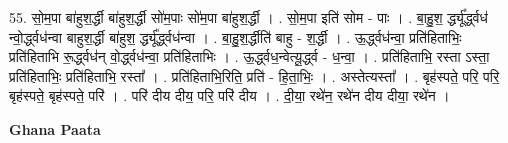 \documentclass[17pt]{extarticle}
\begin{document}
55. सो॒म॒पा बा॑हुश॒र्द्धी बा॑हुश॒र्द्धी सो॑म॒पाः सो॑म॒पा बा॑हुश॒र्द्धी । . सो॒म॒पा इति॑ सोम - पाः । . बा॒हु॒श॒ र्द्ध्यू᳚र्द्ध्वध॑ न्वो॒र्द्ध्वध॑न्वा बाहुश॒र्द्धी बा॑हुश॒ र्द्ध्यू᳚र्द्ध्वध॑न्वा । . बा॒हु॒श॒र्द्धीति॑ बाहु - श॒र्द्धी । . ऊ॒र्द्ध्वध॑न्वा॒ प्रति॑हिताभिः॒ प्रति॑हिताभि रू॒र्द्ध्वध॑न् वो॒र्द्ध्वध॑न्वा॒ प्रति॑हिताभिः । . ऊ॒र्द्ध्वध॒न्वेत्यू॒र्द्ध्व - ध॒न्वा॒ । . प्रति॑हिताभि॒ रस्ता ऽस्ता॒ प्रति॑हिताभिः॒ प्रति॑हिताभि॒ रस्ता᳚ । . प्रति॑हिताभि॒रिति॒ प्रति॑ - हि॒ता॒भिः॒ । . अस्तेत्यस्ता᳚ । . बृह॑स्पते॒ परि॒ परि॒ बृह॑स्पते॒ बृह॑स्पते॒ परि॑ । . परि॑ दीय दीय॒ परि॒ परि॑ दीय । . दी॒या॒ रथे॑न॒ रथे॑न दीय दीया॒ रथे॑न । \newline

\textbf{Ghana Paata } \newline
\end{document}
